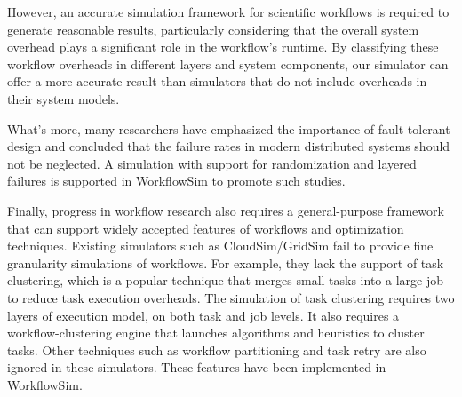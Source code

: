However, an accurate simulation framework for scientific workflows is required to generate reasonable results, particularly considering that the overall system overhead \cite{Overhead2011} plays a significant role in the workflow’s runtime. 
By classifying these workflow overheads in different layers and system components, our simulator can offer a more accurate result than simulators that do not include overheads in their system models.

What’s more, many researchers \cite{Zhang2004, Tang1990, Schroeder2006, Sahoo2004, Oppenheimer2002, Mcconnel} have emphasized the importance of fault tolerant design and concluded that the failure rates in modern distributed systems should not be neglected. A simulation with support for randomization and layered failures is supported in WorkflowSim to promote such studies. 

Finally, progress in workflow research also requires a general-purpose framework that can support widely accepted features of workflows and optimization techniques. Existing simulators such as CloudSim/GridSim \cite{Calheiros2011} fail to provide fine granularity simulations of workflows. For example, they lack the support of task clustering, which is a popular technique that merges small tasks into a large job to reduce task execution overheads. The simulation of task clustering requires two layers of execution model, on both task and job levels. It also requires a workflow-clustering engine that launches algorithms and heuristics to cluster tasks. Other techniques such as workflow partitioning and task retry are also ignored in these simulators. These features have been implemented in WorkflowSim. 


